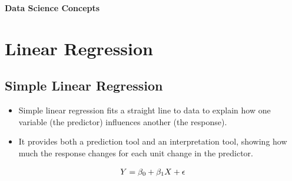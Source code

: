\documentclass[11pt,a4paper]{article}
\begin{document}
\begin{titlepage}
\vspace*{0.25\textheight}
{\Large\textcolor{accent}{\textbf{Data Science Concepts}}}\par
\author{Thomaskutty Reji}
\date{}

\end{titlepage}
\tableofcontents
\newpage

\section{Linear Regression}
\subsection{Simple Linear Regression}
\begin{itemize}
    \item Simple linear regression fits a straight line to data to explain how one variable (the predictor) influences another (the response).

    \item It provides both a prediction tool and an interpretation tool, showing how much the response changes for each unit change in the predictor.
\end{itemize}


\begin{align*} 
\Large Y= \beta_0 + \beta_1 X + \epsilon 
\end{align*} 
\end{document}
